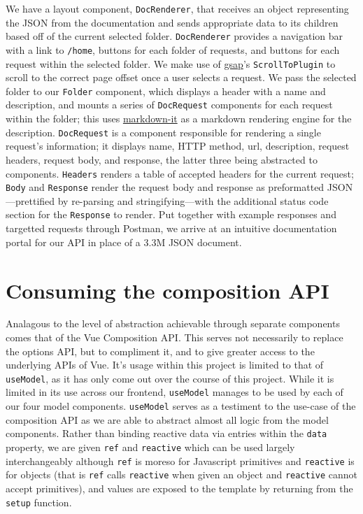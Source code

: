 \documentclass[11pt, twoside, reqno]{book}
\begin{document}
We have a layout component, \texttt{DocRenderer}, that receives an object representing the JSON from the documentation and sends appropriate data to its children based off of the current selected folder. \texttt{DocRenderer} provides a navigation bar with a link to \texttt{/home}, buttons for each folder of requests, and buttons for each request within the selected folder. We make use of \href{https://greensock.com/gsap/}{gsap}'s \texttt{ScrollToPlugin} to scroll to the correct page offset once a user selects a request. We pass the selected folder to our \texttt{Folder} component, which displays a header with a name and description, and mounts a series of \texttt{DocRequest} components for each request within the folder; this uses \href{https://www.npmjs.com/package/markdown-it}{markdown-it} as a markdown rendering engine for the description. \texttt{DocRequest} is a component responsible for rendering a single request's information; it displays name, HTTP method, url, description, request headers, request body, and response, the latter three being abstracted to components. \texttt{Headers} renders a table of accepted headers for the current request; \texttt{Body} and \texttt{Response} render the request body and response as preformatted JSON—prettified by re-parsing and stringifying—with the additional status code section for the \texttt{Response} to render. Put together with example responses and targetted requests through Postman, we arrive at an intuitive documentation portal for our API in place of a 3.3M JSON document.

\section{Consuming the composition API}

Analagous to the level of abstraction achievable through separate components comes that of the Vue Composition API. This serves not necessarily to replace the options API, but to compliment it, and to give greater access to the underlying APIs of Vue. It's usage within this project is limited to that of \texttt{useModel}, as it has only come out over the course of this project. While it is limited in its use across our frontend, \texttt{useModel} manages to be used by each of our four model components. \texttt{useModel} serves as a testiment to the use-case of the composition API as we are able to abstract almost all logic from the model components. Rather than binding reactive data via entries within the \texttt{data} property, we are given \texttt{ref} and \texttt{reactive} which can be used \textit{}largely interchangeably\textit{} although \texttt{ref} is moreso for Javascript primitives and \texttt{reactive} is for objects (that is \texttt{ref} calls \texttt{reactive} when given an object and \texttt{reactive} cannot accept primitives), and values are exposed to the template by returning from the \texttt{setup} function.
\end{document}
